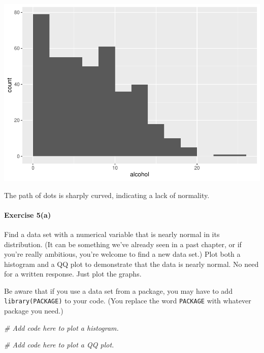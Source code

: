 \documentclass[
]{book}
\newenvironment{Shaded}{\begin{snugshade}}{\end{snugshade}}
\newcommand{\CommentTok}[1]{\textcolor[rgb]{0.56,0.35,0.01}{\textit{#1}}}
\begin{document}
\includegraphics{intro_stats_files/figure-latex/unnamed-chunk-361-1.pdf}

The path of dots is sharply curved, indicating a lack of normality.

\hypertarget{exercise-5a-1}{%
\paragraph*{Exercise 5(a)}\label{exercise-5a-1}}

Find a data set with a numerical variable that is nearly normal in its distribution. (It can be something we've already seen in a past chapter, or if you're really ambitious, you're welcome to find a new data set.) Plot both a histogram and a QQ plot to demonstrate that the data is nearly normal. No need for a written response. Just plot the graphs.

Be aware that if you use a data set from a package, you may have to add \texttt{library(PACKAGE)} to your code. (You replace the word \texttt{PACKAGE} with whatever package you need.)

\begin{Shaded}
\begin{Highlighting}[]
\CommentTok{\# Add code here to plot a histogram.}
\end{Highlighting}
\end{Shaded}

\begin{Shaded}
\begin{Highlighting}[]
\CommentTok{\# Add code here to plot a QQ plot.}
\end{Highlighting}
\end{Shaded}
\end{document}
